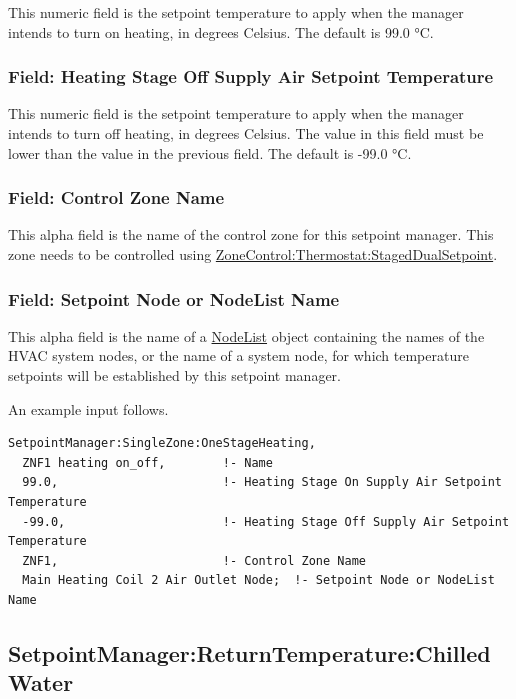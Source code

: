 This numeric field is the setpoint temperature to apply when the manager intends to turn on heating, in degrees Celsius. The default is 99.0 °C.

\subsubsection{Field: Heating Stage Off Supply Air Setpoint Temperature}\label{field-heating-stage-off-supply-air-setpoint-temperature}

This numeric field is the setpoint temperature to apply when the manager intends to turn off heating, in degrees Celsius. The value in this field must be lower than the value in the previous field. The default is -99.0 °C.

\subsubsection{Field: Control Zone Name}\label{field-control-zone-name-4}

This alpha field is the name of the control zone for this setpoint manager. This zone needs to be controlled using \hyperref[zonecontrolthermostatstageddualsetpoint]{ZoneControl:Thermostat:StagedDualSetpoint}.

\subsubsection{Field: Setpoint Node or NodeList Name}\label{field-setpoint-node-or-nodelist-name-21}

This alpha field is the name of a \hyperref[nodelist]{NodeList} object containing the names of the HVAC system nodes, or the name of a system node, for which temperature setpoints will be established by this setpoint manager.

An example input follows.

\begin{lstlisting}
SetpointManager:SingleZone:OneStageHeating,
  ZNF1 heating on_off,        !- Name
  99.0,                       !- Heating Stage On Supply Air Setpoint Temperature
  -99.0,                      !- Heating Stage Off Supply Air Setpoint Temperature
  ZNF1,                       !- Control Zone Name
  Main Heating Coil 2 Air Outlet Node;  !- Setpoint Node or NodeList Name
\end{lstlisting}

\subsection{SetpointManager:ReturnTemperature:ChilledWater}\label{setpointmanagerreturntemperaturechilledwater}

